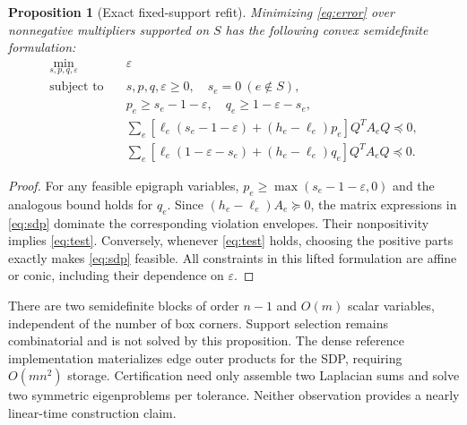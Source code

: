\documentclass[11pt]{article}
\newtheorem{proposition}[theorem]{Proposition}
\newcommand{\eps}{\varepsilon}
\begin{document}
\begin{proposition}[Exact fixed-support refit]\label{prop:sdp}
Minimizing \eqref{eq:error} over nonnegative multipliers supported on $S$ has the following convex semidefinite formulation:
\begin{align}\label{eq:sdp}
\min_{s,p,q,\eps}\quad &\eps\\
\text{subject to}\quad &s,p,q,\eps\ge0,\quad s_e=0\ (e\notin S),\nonumber\\
&p_e\ge s_e-1-\eps,\quad q_e\ge1-\eps-s_e,\nonumber\\
&\sum_e[\ell_e(s_e-1-\eps)+(h_e-\ell_e)p_e]Q^TA_eQ\preceq0,\nonumber\\
&\sum_e[\ell_e(1-\eps-s_e)+(h_e-\ell_e)q_e]Q^TA_eQ\preceq0.\nonumber
\end{align}
\end{proposition}
\begin{proof}
For any feasible epigraph variables, $p_e\ge\max(s_e-1-\eps,0)$ and the analogous bound holds for $q_e$. Since $(h_e-\ell_e)A_e\succeq0$, the matrix expressions in \eqref{eq:sdp} dominate the corresponding violation envelopes. Their nonpositivity implies \eqref{eq:test}. Conversely, whenever \eqref{eq:test} holds, choosing the positive parts exactly makes \eqref{eq:sdp} feasible. All constraints in this lifted formulation are affine or conic, including their dependence on $\eps$.
\end{proof}

There are two semidefinite blocks of order $n-1$ and $O(m)$ scalar variables, independent of the number of box corners. Support selection remains combinatorial and is not solved by this proposition. The dense reference implementation materializes edge outer products for the SDP, requiring $O(mn^2)$ storage. Certification need only assemble two Laplacian sums and solve two symmetric eigenproblems per tolerance. Neither observation provides a nearly linear-time construction claim.
\end{document}
